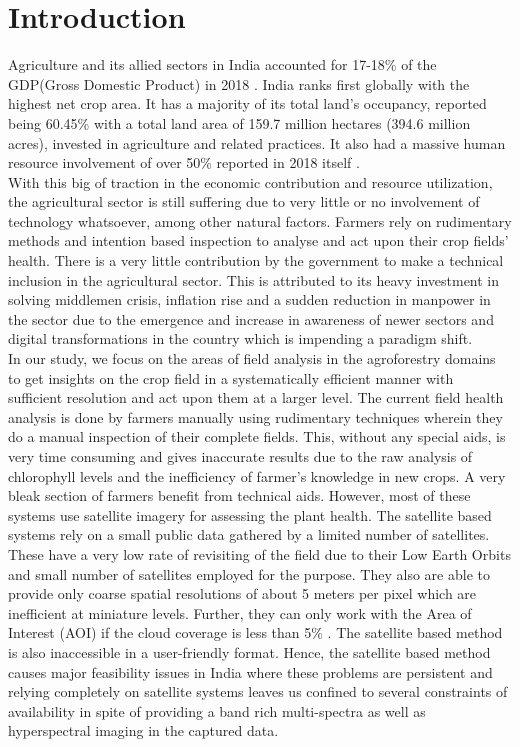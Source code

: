 
\chapter{Introduction}


Agriculture and its allied sectors in India accounted for 17-18\% of the GDP(Gross Domestic Product) in 2018 \cite{stats1}. India ranks first globally with the highest net crop area\cite{stats2}. It has a majority of its total land's occupancy, reported being 60.45\% with a total land area of 159.7 million hectares (394.6 million acres), invested in agriculture and related practices. It also had a massive human resource involvement of over 50\% reported in 2018 itself \cite{stats1}.
\\ 

With this big of traction in the economic contribution and resource utilization, the agricultural sector is still suffering due to very little or no involvement of technology whatsoever, among other natural factors. Farmers rely on rudimentary methods and intention based inspection to analyse and act upon their crop fields' health. There is a very little contribution by the government to make a technical inclusion in the agricultural sector. This is attributed to its heavy investment in solving middlemen crisis, inflation rise and a sudden reduction in manpower in the sector due to the emergence and increase in awareness of newer sectors and digital transformations in the country which is impending a paradigm shift.
\\

In our study, we focus on the areas of field analysis in the agroforestry domains to get insights on the crop field in a systematically efficient manner with sufficient resolution and act upon them at a larger level. The current field health analysis is done by farmers manually using rudimentary techniques wherein they do a manual inspection of their complete fields. This, without any special aids, is very time consuming and gives inaccurate results due to the raw analysis of chlorophyll levels and the inefficiency of farmer's knowledge in new crops. A very bleak section of farmers benefit from technical aids. However, most of these systems use satellite imagery for assessing the plant health. The satellite based systems rely on a small public data gathered by a limited number of satellites. These have a very low rate of revisiting of the field due to their Low Earth Orbits and small number of satellites employed for the purpose. They also are able to provide only coarse spatial resolutions of about 5 meters per pixel which are inefficient at miniature levels. Further, they can only work with the Area of Interest (AOI) if the cloud coverage is less than 5\% \cite{eighth}. The satellite based method is also inaccessible in a user-friendly format. Hence, the satellite based method causes major feasibility issues in India where these problems are persistent and relying completely on satellite systems leaves us confined to several constraints of availability in spite of providing a band rich multi-spectra as well as hyperspectral imaging in the captured data.
\\

